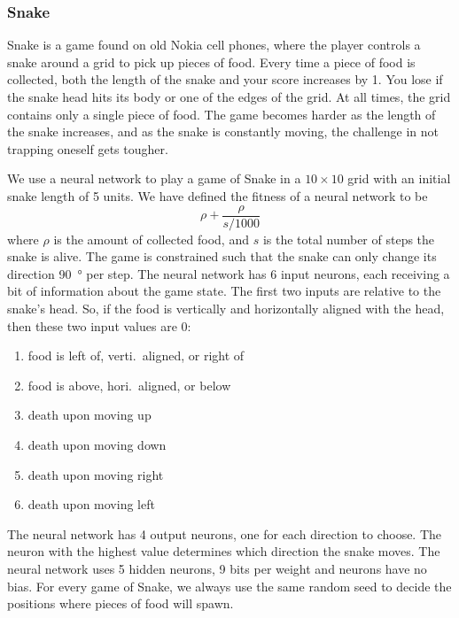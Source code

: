 \subsubsection{Snake}
Snake is a game found on old Nokia cell phones, where the player controls a snake around a grid to pick up pieces of food.
Every time a piece of food is collected, both the length of the snake and your score increases by 1.
You lose if the snake head hits its body or one of the edges of the grid.
At all times, the grid contains only a single piece of food.
The game becomes harder as the length of the snake increases, and as the snake is constantly moving, the challenge in not trapping oneself gets tougher.

We use a neural network to play a game of Snake in a $10 \times 10$ grid with an initial snake length of 5 units.
We have defined the fitness of a neural network to be 
\[
  \rho + \frac{\rho}{s/1000}
\]
where $\rho$ is the amount of collected food, and $s$ is the total number of steps the snake is alive. The game is constrained such that the snake can only change its direction \SI{90}{\degree} per step. The neural network has 6 input neurons, each receiving a bit of information about the game state. The first two inputs are relative to the snake's head. So, if the food is vertically and horizontally aligned with the head, then these two input values are 0:
\begin{enumerate}
  \item {} food is left of, verti.\ aligned, or right of
  \item {} food is above, hori.\ aligned, or below
  \item {} death upon moving up 
  \item {} death upon moving down 
  \item {} death upon moving right
  \item {} death upon moving left 
\end{enumerate}
The neural network has 4 output neurons, one for each direction to choose. The neuron with the highest value determines which direction the snake moves.
The neural network uses 5 hidden neurons, 9 bits per weight and neurons have no bias.
For every game of Snake, we always use the same random seed to decide the positions where pieces of food will spawn.
